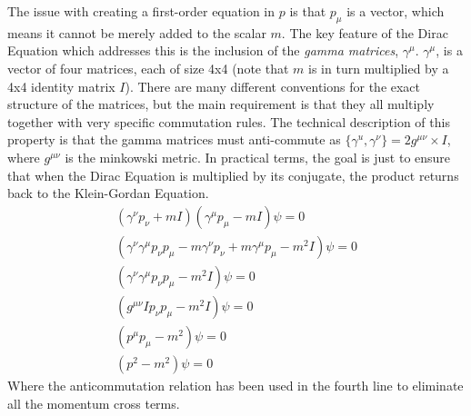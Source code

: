     The issue with creating a first-order equation in $p$ is that $p_\mu$ is a vector, which means it cannot be merely added to the scalar $m$.
    The key feature of the Dirac Equation which addresses this is the inclusion of the \textit{gamma matrices}, $\gamma^\mu$.
    $\gamma^\mu$, is a vector of four matrices, each of size 4x4 (note that $m$ is in turn multiplied by a 4x4 identity matrix $I$).
    There are many different conventions for the exact structure of the matrices,
        but the main requirement is that they all multiply together with very specific commutation rules.
    The technical description of this property is that the gamma matrices must
        anti-commute as $\{\gamma^u, \gamma^\nu\} = 2g^{\mu \nu}\times I$,
        where $g^{\mu\nu}$ is the minkowski metric.
    In practical terms, the goal is just to ensure that when the Dirac Equation is multiplied by its conjugate,
        the product returns back to the Klein-Gordan Equation.
    \begin{equation} \begin{split}
        (\gamma^\nu p_\nu + m I) (\gamma^\mu p_\mu - m I) \psi = 0
        \\ (\gamma^\nu \gamma^\mu p_\nu p_\mu - m \gamma^\nu p_\nu + m \gamma^\mu p_\mu - m^2 I) \psi = 0
        \\ (\gamma^\nu \gamma^\mu p_\nu p_\mu - m^2 I) \psi = 0
        \\ (g^{\mu \nu} I p_\nu p_\mu - m^2 I) \psi = 0
        \\ (p^\mu p_\mu - m^2 ) \psi = 0
        \\ (p^2 - m^2) \psi = 0
    \end{split} \end{equation}
    Where the anticommutation relation has been used in the fourth line to eliminate all the momentum cross terms.






